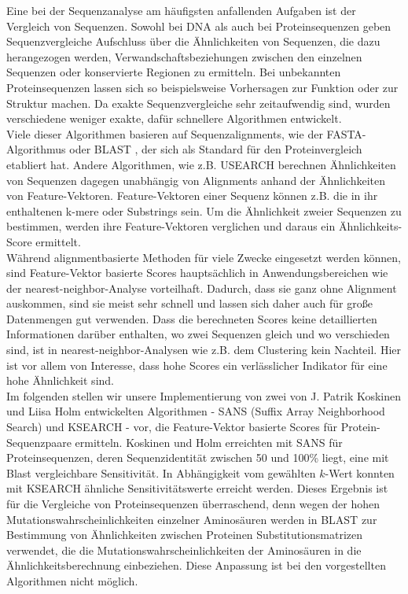 \documentclass{article}
\begin{document}
Eine bei der Sequenzanalyse am häufigsten anfallenden Aufgaben ist der Vergleich
von Sequenzen. 
Sowohl bei DNA als auch bei Proteinsequenzen geben Sequenzvergleiche Aufschluss über die Ähnlichkeiten von Sequenzen, die dazu herangezogen werden, Verwandschaftsbeziehungen zwischen den einzelnen Sequenzen oder konservierte Regionen zu ermitteln. Bei unbekannten Proteinsequenzen lassen sich so beispielsweise Vorhersagen zur Funktion oder zur Struktur machen. Da exakte Sequenzvergleiche sehr zeitaufwendig sind, wurden verschiedene weniger exakte, dafür schnellere Algorithmen entwickelt.\\
Viele dieser Algorithmen basieren auf Sequenzalignments, wie der FASTA-Algorithmus \cite{FASTA} oder BLAST \cite{BLAST}, der sich als Standard für den Proteinvergleich etabliert hat.
Andere Algorithmen, wie z.B. USEARCH \cite{USEARCH} berechnen Ähnlichkeiten von Sequenzen dagegen unabhängig von Alignments anhand der Ähnlichkeiten von Feature-Vektoren. 
Feature-Vektoren einer Sequenz können z.B. die in ihr enthaltenen k-mere oder Substrings sein. 
Um die Ähnlichkeit zweier Sequenzen zu bestimmen, werden ihre Feature-Vektoren verglichen und daraus ein Ähnlichkeits-Score ermittelt.\\
Während alignmentbasierte Methoden für viele Zwecke eingesetzt werden können, sind Feature-Vektor basierte Scores hauptsächlich in Anwendungsbereichen wie der nearest-neighbor-Analyse vorteilhaft. 
Dadurch, dass sie ganz ohne Alignment auskommen, sind sie meist sehr schnell und lassen sich daher auch für große Datenmengen gut verwenden. 
Dass die berechneten Scores keine detaillierten Informationen darüber enthalten,
wo zwei Sequenzen gleich und wo verschieden sind, ist in nearest-neighbor-Analysen wie z.B. dem Clustering kein Nachteil. 
Hier ist vor allem von Interesse, dass hohe Scores ein verlässlicher Indikator für eine hohe Ähnlichkeit sind.\\
Im folgenden stellen wir unsere Implementierung von zwei von J. Patrik Koskinen und Liisa Holm entwickelten Algorithmen - SANS (Suffix Array Neighborhood Search) und KSEARCH - vor, die Feature-Vektor basierte Scores für Protein-Sequenzpaare ermitteln. Koskinen und Holm erreichten mit SANS für Proteinsequenzen, deren Sequenzidentität zwischen 50 und 100\% liegt, eine mit Blast vergleichbare Sensitivität. In Abhängigkeit vom gewählten $k$-Wert konnten mit KSEARCH ähnliche Sensitivitätswerte erreicht werden. Dieses Ergebnis ist für die Vergleiche von Proteinsequenzen überraschend, denn wegen der hohen Mutationswahrscheinlichkeiten einzelner Aminosäuren werden in BLAST zur Bestimmung von Ähnlichkeiten zwischen Proteinen Substitutionsmatrizen verwendet, die die Mutationswahrscheinlichkeiten der Aminosäuren in die Ähnlich\-keitsberechnung einbeziehen. 
Diese Anpassung ist bei den vorgestellten Algorithmen nicht möglich.
\end{document}
